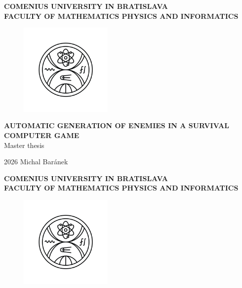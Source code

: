 \documentclass[12pt, twoside, openany]{book}
\def\mfrok{2026}
\def\mftitle{Automatic generation of enemies in a survival computer game}
\def\mfthesistype{Master thesis}
\def\mfauthor{Michal Baránek}
\def\mfuniversity{COMENIUS UNIVERSITY IN BRATISLAVA}
\def\mffaculty{FACULTY OF MATHEMATICS PHYSICS AND INFORMATICS}
\begin{document}
	\frontmatter
	
	
	\thispagestyle{empty}
	
	\noindent
	\begin{minipage}{\textwidth}
		\begin{center}
			\textbf{\mfuniversity \\
				\mffaculty}
		\end{center}
	\end{minipage}
	
	\vfill
	\begin{figure}[!hbt]
		\begin{center}
			\includegraphics[width=0.4\textwidth]{images/FMFI_logo_BP.png}
			\label{img:logo}
		\end{center}
	\end{figure}
	\begin{center}
		\textbf{\MakeUppercase{\Large\mftitle}}\\
		\mfthesistype
	\end{center}
	\vfill
	\mfrok \hfill
	\mfauthor
	\cleardoublepage
	
	
	
	\thispagestyle{empty}
	\noindent
	\begin{minipage}{\textwidth}
		\begin{center}
			\textbf{\mfuniversity \\
				\mffaculty}
		\end{center}
	\end{minipage}
	
	\vfill
	\begin{figure}[!hbt]
		\begin{center}
			\includegraphics[width=0.4\textwidth]{images/FMFI_logo_BP.png}
			\label{img:logo_dark}
		\end{center}
	\end{figure}
	
\end{document}
